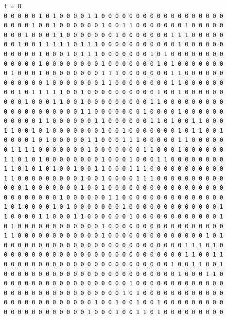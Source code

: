 \documentclass[a4paper,12pt]{article}
\begin{document}
\begin{verbatim}
t = 8
0 0 0 0 0 1 0 1 0 0 0 0 1 1 0 0 0 0 0 0 0 0 0 0 0 0 0 0 0 0 0 0 
0 0 0 0 1 0 0 1 0 0 0 0 0 0 1 0 0 1 1 0 0 0 0 0 0 0 1 0 0 0 0 0 
0 0 0 1 0 0 0 1 1 0 0 0 0 0 0 0 1 0 0 0 0 0 0 0 1 1 1 0 0 0 0 0 
0 0 1 0 0 1 1 1 1 1 0 1 1 1 0 0 0 0 0 0 0 0 0 0 0 1 0 0 0 0 0 0 
0 0 0 0 0 1 0 0 0 1 0 1 1 1 0 0 0 0 0 0 0 1 0 1 0 0 0 0 0 0 0 0 
0 0 0 0 0 1 0 0 0 0 0 0 0 0 1 0 0 0 0 0 0 0 1 0 1 0 0 0 0 0 0 0 
0 1 0 0 0 1 0 0 0 0 0 0 0 0 1 1 1 0 0 0 0 0 0 0 1 1 0 0 0 0 0 0 
0 0 0 0 0 0 1 0 0 0 0 0 0 0 1 1 0 0 0 0 0 0 0 0 1 1 0 0 0 0 0 0 
0 0 1 0 1 1 1 1 1 0 0 1 0 0 0 0 0 0 0 0 0 0 1 0 0 1 0 0 0 0 0 0 
0 0 0 1 0 0 0 1 1 0 0 1 0 0 0 0 0 0 0 0 0 1 1 0 0 0 0 0 0 0 0 0 
0 0 0 0 0 0 0 0 0 0 0 1 1 0 0 0 0 0 0 0 1 0 0 0 0 1 0 0 0 0 0 0 
0 0 0 0 0 1 1 0 0 0 0 0 0 1 1 0 0 0 0 0 0 1 1 0 1 0 0 1 1 0 0 0 
1 1 0 0 1 0 1 0 0 0 0 0 0 0 1 0 0 1 0 0 0 0 0 0 0 1 0 1 1 0 0 1 
0 0 0 0 1 0 1 0 0 0 0 0 1 1 0 0 0 1 1 1 0 0 0 0 0 1 1 0 0 0 0 0 
0 1 1 1 1 0 0 0 0 0 0 0 1 0 0 0 0 0 0 0 1 1 0 0 0 1 0 0 0 0 0 0 
1 1 0 1 0 1 0 0 0 0 0 0 0 0 1 0 0 0 1 0 0 0 1 1 0 0 0 0 0 0 0 0 
1 1 0 1 0 1 0 1 0 0 1 0 0 1 1 0 0 0 1 1 1 0 0 0 0 0 0 0 0 0 0 0 
1 1 0 0 0 0 0 0 0 0 0 1 0 0 1 0 0 0 0 1 1 1 0 0 0 0 0 0 0 0 0 0 
0 0 0 1 0 0 0 0 0 0 0 1 0 0 1 0 0 0 0 0 0 0 0 0 0 0 0 0 0 0 0 0 
0 0 0 0 0 0 0 0 1 0 0 0 0 0 0 1 1 0 0 0 0 0 0 0 0 0 0 0 0 0 0 0 
1 0 1 0 0 0 0 1 0 1 0 0 0 0 0 0 0 1 0 0 0 0 0 0 0 0 0 0 0 0 0 1 
1 0 0 0 0 1 1 0 0 0 1 1 0 0 0 0 0 0 1 0 0 0 0 0 0 0 0 0 0 0 0 1 
0 1 0 0 0 0 0 0 0 0 0 0 0 0 1 0 0 0 0 0 0 0 0 0 0 0 0 0 0 0 0 0 
1 1 0 0 0 0 0 0 0 0 0 0 0 0 1 0 0 0 0 0 0 0 0 0 0 0 0 0 0 1 0 1 
0 0 0 0 0 0 0 0 0 0 0 0 0 0 0 0 0 0 0 0 0 0 0 0 0 0 1 1 1 0 1 0 
0 0 0 0 0 0 0 0 0 0 0 0 0 0 0 0 0 0 0 0 0 0 0 0 0 0 1 1 0 0 1 1 
0 0 0 0 0 0 0 0 0 0 0 0 0 0 0 0 0 0 0 0 0 0 0 0 1 0 0 1 1 0 0 1 
0 0 0 0 0 0 0 0 0 0 0 0 0 0 0 0 0 0 0 0 0 0 0 0 0 1 0 0 0 1 1 0 
0 0 0 0 0 0 0 0 0 0 0 0 0 0 0 0 0 0 1 0 0 0 0 0 0 0 0 0 0 0 0 0 
0 0 0 0 0 0 0 0 0 0 0 0 0 0 0 0 0 1 0 1 0 0 0 0 0 0 0 0 0 0 0 0 
0 0 0 0 0 0 0 0 0 0 0 0 0 1 0 0 1 0 0 1 0 0 1 0 0 0 0 0 0 0 0 0 
0 0 0 0 0 0 0 0 0 0 0 0 1 0 0 0 1 0 0 1 1 0 1 0 0 0 0 0 0 0 0 0 




\end{verbatim}
\end{document}
